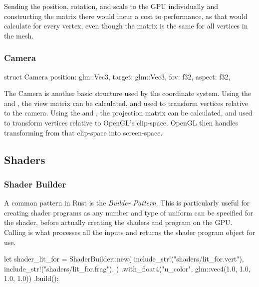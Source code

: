 Sending the position, rotation, and scale to the GPU individually and constructing the matrix there would incur a cost to performance, as that would calculate for every vertex, even though the matrix is the same for all vertices in the mesh.

\subsubsection{Camera}
  \begin{rustcode}
struct Camera {
    position: glm::Vec3,
    target: glm::Vec3,
    fov: f32,
    aspect: f32,
}
  \end{rustcode}

The Camera is another basic structure used by the coordinate system.
Using the  and , the view matrix can be calculated, and used to transform vertices relative to the camera.
Using the  and , the projection matrix can be calculated, and used to transform vertices relative to OpenGL's clip-space\autocite{de_vries_learn_2020}.
OpenGL then handles transforming from that clip-space into screen-space.


\subsection{Shaders}

\subsubsection{Shader Builder}
A common pattern in Rust is the \emph{Builder Pattern}.
This is particularly useful for creating shader programs as any number and type of uniform can be specified for the shader, before actually creating the shaders and program on the GPU.
Calling  is what processes all the inputs and returns the shader program object for use.
  \begin{rustcode}
let shader_lit_for = ShaderBuilder::new(
    include_str!("shaders/lit_for.vert"),
    include_str!("shaders/lit_for.frag"),
)
.with_float4("u_color", glm::vec4(1.0, 1.0, 1.0, 1.0))
.build();
  \end{rustcode}

